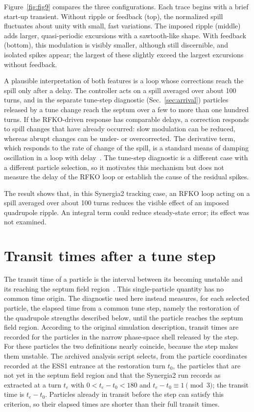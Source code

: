 \documentclass[a4paper,fleqn]{cas-sc}
\begin{document}
Figure~\ref{fig:fig9} compares the three configurations. Each trace begins with a brief start-up transient. Without ripple or feedback (top), the normalized spill fluctuates about unity with small, fast variations. The imposed ripple (middle) adds larger, quasi-periodic excursions with a sawtooth-like shape. With feedback (bottom), this modulation is visibly smaller, although still discernible, and isolated spikes appear; the largest of these slightly exceed the largest excursions without feedback.

A plausible interpretation of both features is a loop whose corrections reach the spill only after a delay. The controller acts on a spill averaged over about 100 turns, and in the separate tune-step diagnostic (Sec.~\ref{sec:arrival}) particles released by a tune change reach the septum over a few to more than one hundred turns. If the RFKO-driven response has comparable delays, a correction responds to spill changes that have already occurred: slow modulation can be reduced, whereas abrupt changes can be under- or overcorrected. The derivative term, which responds to the rate of change of the spill, is a standard means of damping oscillation in a loop with delay~\cite{pid}. The tune-step diagnostic is a different case with a different particle selection, so it motivates this mechanism but does not measure the delay of the RFKO loop or establish the cause of the residual spikes.

The result shows that, in this Synergia2 tracking case, an RFKO loop acting on a spill averaged over about 100 turns reduces the visible effect of an imposed quadrupole ripple. An integral term could reduce steady-state error; its effect was not examined.

\section{\label{sec:arrival}Transit times after a tune step}

The transit time of a particle is the interval between its becoming unstable and its reaching the septum field region~\cite{pullia}. This single-particle quantity has no common time origin. The diagnostic used here instead measures, for each selected particle, the elapsed time from a common tune step, namely the restoration of the quadrupole strengths described below, until the particle reaches the septum field region. According to the original simulation description, transit times are recorded for the particles in the narrow phase-space shell released by the step. For these particles the two definitions nearly coincide, because the step makes them unstable. The archived analysis script selects, from the particle coordinates recorded at the ESS1 entrance at the restoration turn $t_0$, the particles that are not yet in the septum field region and that the Synergia2 run records as extracted at a turn $t_e$ with $0<t_e-t_0<180$ and $t_e-t_0\equiv1 \pmod 3$; the transit time is $t_e-t_0$. Particles already in transit before the step can satisfy this criterion, so their elapsed times are shorter than their full transit times.
\end{document}
